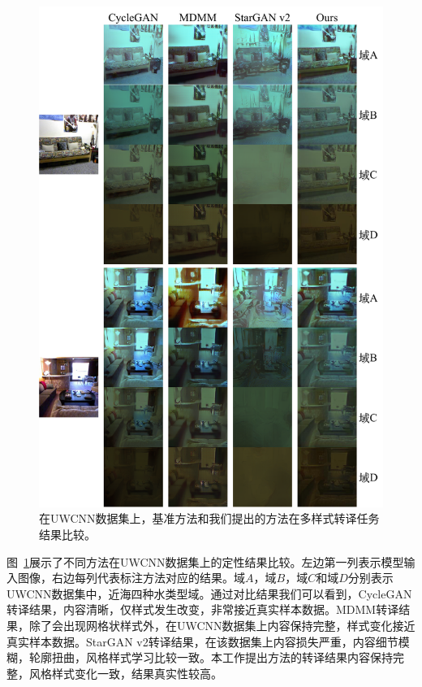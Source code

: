 \begin{figure}[htp]
    \centering
  \includegraphics[width=\textwidth]{figures/comparison_domain_uwcnn.pdf}
  \caption{在UWCNN数据集上，基准方法和我们提出的方法在多样式转译任务结果比较。}
  \label{fig:comparison_domain_uwcnn}
\end{figure}

图~\ref{fig:comparison_domain_uwcnn}展示了不同方法在UWCNN数据集上的定性结果比较。左边第一列表示模型输入图像，右边每列代表标注方法对应的结果。域$A$，域$B$，域$C$和域$D$分别表示UWCNN数据集中，近海四种水类型域。通过对比结果我们可以看到，CycleGAN转译结果，内容清晰，仅样式发生改变，非常接近真实样本数据。MDMM转译结果，除了会出现网格状样式外，在UWCNN数据集上内容保持完整，样式变化接近真实样本数据。StarGAN v2转译结果，在该数据集上内容损失严重，内容细节模糊，轮廓扭曲，风格样式学习比较一致。本工作提出方法的转译结果内容保持完整，风格样式变化一致，结果真实性较高。


